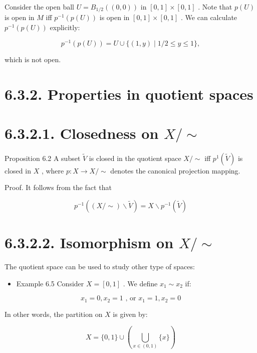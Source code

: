 Consider the open ball \(U = {B}_{1/2}\left( \left( {0,0}\right) \right)\) in \(\left\lbrack  {0,1}\right\rbrack   \times  \left\lbrack  {0,1}\right\rbrack\) . Note that \(p\left( U\right)\) is open in \(M\) iff \({p}^{-1}\left( {p\left( U\right) }\right)\) is open in \(\left\lbrack  {0,1}\right\rbrack   \times  \left\lbrack  {0,1}\right\rbrack\) . We can calculate \({p}^{-1}\left( {p\left( U\right) }\right)\) explicitly:

\[
{p}^{-1}\left( {p\left( U\right) }\right)  = U \cup  \{ \left( {1,y}\right)  \mid  1/2 \leq  y \leq  1\} ,
\]

which is not open.

\section*{6.3.2. Properties in quotient spaces}

\section*{6.3.2.1. Closedness on \(X/ \sim\)}

Proposition 6.2 A subset \(\widetilde{V}\) is closed in the quotient space \(X/ \sim\) iff \({p}^{1}\left( \widetilde{V}\right)\) is closed in \(X\) , where \(p : X \rightarrow  X/ \sim\) denotes the canonical projection mapping.

Proof. It follows from the fact that

\[
{p}^{-1}\left( {\left( {X/ \sim  }\right)  \smallsetminus  \widetilde{V}}\right)  = X \smallsetminus  {p}^{-1}\left( \widetilde{V}\right)
\]

\section*{6.3.2.2. Isomorphism on \(X/ \sim\)}

The quotient space can be used to study other type of spaces:

\begin{itemize}
\item Example 6.5 Consider \(X = \left\lbrack  {0,1}\right\rbrack\) . We define \({x}_{1} \sim  {x}_{2}\) if:
\end{itemize}

\[
{x}_{1} = 0,{x}_{2} = 1\text{ , or }{x}_{1} = 1,{x}_{2} = 0
\]

In other words, the partition on \(X\) is given by:

\[
X = \{ 0,1\}  \cup  \left( {\mathop{\bigcup }\limits_{{x \in  \left( {0,1}\right) }}\{ x\} }\right)
\]

